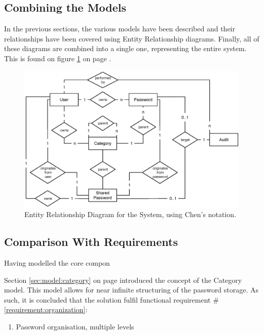 		\subsection{Combining the Models}
			In the previous sections, the various models have been described and their relationships have been covered using Entity Relationship diagrams. Finally, all of these diagrams are combined into a single one, representing the entire system. This is found on figure \ref{fig:erd:full} on page \pageref{fig:erd:full}.

			\begin{figure}[p]
				\centering
				\includegraphics[width=\textwidth]{figures/design/uml/erd-full.eps}
				\caption{Entity Relationship Diagram for the System, using Chen's notation.}
				\label{fig:erd:full}
			\end{figure}

		\subsection{Comparison With Requirements}
			\label{requirement:fulfilled:organization}
			\label{requirement:fulfilled:new}
			\label{requirement:fulfilled:retrieve}
			\label{requirement:fulfilled:delete}


			Having modelled the core compon

			Section \ref{sec:model:category} on page \pageref{sec:model:category} introduced the concept of the Category model. This model allows for near infinite structuring of the password storage. As such, it is concluded that the solution fulfil functional requirement \#\ref{requirement:organization}:
			\vspace{-3ex}\begin{enumerate}
				\setlength\itemsep{0.1em}
				\setcounter{enumi}{4-1}
				\item Password organisation, multiple levels
			\end{enumerate}

